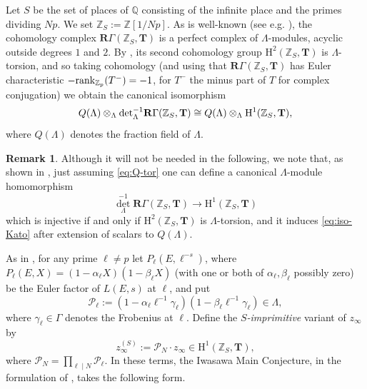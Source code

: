 \documentclass[10pt,reqno]{amsart}
\numberwithin{equation}{section}
\theoremstyle{plain}
\theoremstyle{definition}
\newtheorem{rmk}[thm]{Remark}
\theoremstyle{definition}
\theoremstyle{plain}
\theoremstyle{plain}
\theoremstyle{plain}
\theoremstyle{plain}
\theoremstyle{plain}
\theoremstyle{plain}
\newcommand{\Tc}{\mathbf{T}}
\newcommand{\Z}{\mathbb{Z}}
\newcommand{\Q}{\mathbb{Q}}
\newcommand{\rH}{\mathrm{H}}
\begin{document}
Let $S$ be the set of places of $\Q$ consisting of the infinite place and the primes dividing $Np$. We set $\Z_S:=\Z[1/Np]$. 
%
As is well-known (see e.g. \cite{fukaya-kato-AMS}), the cohomology complex $\mathbf{R}\Gamma(\Z_S,\Tc)$ is a perfect complex of $\Lambda$-modules, acyclic outside  degrees $1$ and $2$. By \cite[Thm.~12.4(1)]{kato-euler-systems}, its second cohomology group $\rH^2(\Z_S,\Tc)$ is $\Lambda$-torsion, and so taking cohomology (and using that $\mathbf{R}\Gamma(\Z_S,\Tc)$ has Euler characteristic $-{\rm rank}_{\Z_p}(T^-)=-1$, for $T^-$ the minus part of $T$ for complex conjugation) we obtain the canonical isomorphism
\begin{equation}\label{eq:iso-Kato}
Q(\Lambda)\otimes_\Lambda{\rm det}_\Lambda^{-1}\mathbf{R}\Gamma(\Z_S,\Tc)\cong
Q(\Lambda)\otimes_\Lambda\rH^1(\Z_S,\Tc),
\end{equation}
where $Q(\Lambda)$ denotes the fraction field of $\Lambda$.

\begin{rmk}
Although it will not be needed in the following, we note that, as shown in \cite[Thm.~2.18]{burns-sano-IMRN}, just assuming \eqref{eq:Q-tor} one can define a canonical $\Lambda$-module homomorphism
\[
{\det}_\Lambda^{-1}\mathbf{R}\Gamma(\Z_S,\Tc)\rightarrow\rH^1(\Z_S,\Tc)
\]
which is injective if and only if $\rH^2(\Z_S,\Tc)$ is $\Lambda$-torsion, and it induces \eqref{eq:iso-Kato} after extension of scalars to $Q(\Lambda)$.
\end{rmk}

As in \cite{greenvats}, for any prime $\ell\neq p$ let $P_\ell(E,\ell^{-s})$, where $P_\ell(E,X)=(1-\alpha_\ell X)(1-\beta_\ell X)$ (with one or both of $\alpha_\ell,\beta_\ell$ possibly zero) be the Euler factor of $L(E,s)$ at $\ell$, and put
\begin{equation}\label{eq:ell-euler}
\mathcal{P}_\ell:=(1-\alpha_\ell\ell^{-1}\gamma_\ell)(1-\beta_\ell\ell^{-1}\gamma_\ell)\in\Lambda,
\end{equation}
where $\gamma_\ell\in\Gamma$ denotes the Frobenius at $\ell$. Define the \emph{$S$-imprimitive} variant of $z_\infty$ by
\begin{equation}\label{eq:S-impr-Kato}
z_\infty^{(S)}:=\mathcal{P}_N\cdot z_\infty\in\rH^1(\Z_S,\Tc),
\end{equation}
where $\mathcal{P}_N=\prod_{\ell\mid N}\mathcal{P}_\ell$. 
In these terms, the Iwasawa Main Conjecture, in the formulation of \cite[Conj.~3.4]{kataoka-sano}, takes the following form.
\end{document}

